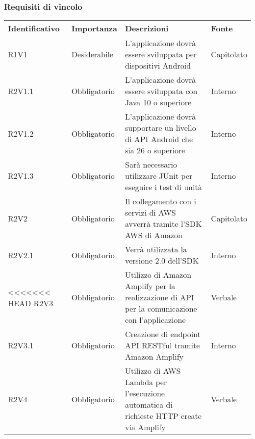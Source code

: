 \subsubsection{Requisiti di vincolo}
\begin{center}
	\renewcommand{\arraystretch}{1.5}
	\begin{longtable}{  >{\RaggedRight}p{2.5cm}  
						>{\RaggedRight}p{2.1cm} 
						>{\RaggedRight}p{7cm}  
						>{\RaggedRight}p{1.7cm} 
						}
		\rowcolor{tableHeadYellow}

		\textbf{Identificativo}   & \textbf{Importanza} & \textbf{Descrizioni} & \textbf{Fonte} \\ 
		\endhead

		R1V1   & Desiderabile & L'applicazione dovrà essere sviluppata per dispositivi Android                                                                             & Capitolato            \\  
		R2V1.1 & Obbligatorio & L'applicazione dovrà essere sviluppata con Java 10 o superiore                                                                             & Interno               \\  
		R2V1.2 & Obbligatorio & L'applicazione dovrà supportare un livello di API Android che sia 26 o superiore                                                           & Interno               \\  
		R2V1.3 & Obbligatorio & Sarà necessario utilizzare JUnit per eseguire i test di unità                                                                              & Interno               \\  
		R2V2   & Obbligatorio & Il collegamento con i servizi di AWS avverrà tramite l'SDK AWS  di Amazon                                                                  & Capitolato            \\  
		R2V2.1 & Obbligatorio & Verrà utilizzata la versione 2.0 dell'SDK                                                                                                  & Interno               \\  
<<<<<<< HEAD
		R2V3   & Obbligatorio & Utilizzo di Amazon Amplify per la realizzazione di API per la comunicazione con l'applicazione                                         & Verbale               \\  
		R2V3.1 & Obbligatorio & Creazione di endpoint API RESTful tramite Amazon Amplify & Interno               \\  
		R2V4   & Obbligatorio & Utilizzo di AWS Lambda per l'esecuzione automatica di richieste HTTP create via Amplify & Verbale               \\  

\end{longtable}
\end{center}
